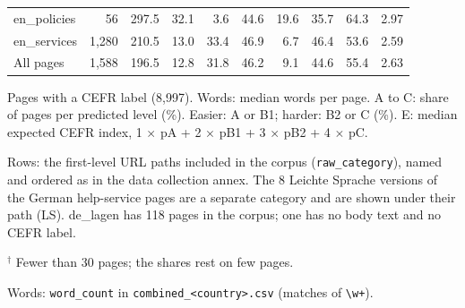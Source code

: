 \begin{table}[htbp]
\begin{threeparttable}
\begin{tabular}{lrrrrrrrrr}
\quad en\_policies & 56 & 297.5 & 32.1 & 3.6 & 44.6 & 19.6 & 35.7 & 64.3 & 2.97 \\
\quad en\_services & 1,280 & 210.5 & 13.0 & 33.4 & 46.9 & 6.7 & 46.4 & 53.6 & 2.59 \\
\quad All pages & 1,588 & 196.5 & 12.8 & 31.8 & 46.2 & 9.1 & 44.6 & 55.4 & 2.63 \\
\hline
\end{tabular}
\begin{tablenotes}
\footnotesize
\item Pages with a CEFR label (8,997). Words: median words per page. A to C: share of pages per predicted level (\%). Easier: A or B1; harder: B2 or C (\%). E: median expected CEFR index, 1 $\times$ pA + 2 $\times$ pB1 + 3 $\times$ pB2 + 4 $\times$ pC.
\item Rows: the first-level URL paths included in the corpus (\texttt{raw\_category}), named and ordered as in the data collection annex. The 8 Leichte Sprache versions of the German help-service pages are a separate category and are shown under their path (LS). de\_lagen has 118 pages in the corpus; one has no body text and no CEFR label.
\item $^\dagger$ Fewer than 30 pages; the shares rest on few pages.
\item Words: \texttt{word\_count} in \texttt{combined\_<country>.csv} (matches of \texttt{\textbackslash w+}).
\end{tablenotes}
\end{threeparttable}
\end{table}
